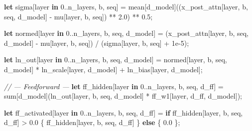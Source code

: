 \documentclass[11pt,]{article}
\newenvironment{Shaded}{}{}
\newcommand{\CommentTok}[1]{\textcolor[rgb]{0.38,0.63,0.69}{\textit{#1}}}
\newcommand{\DecValTok}[1]{\textcolor[rgb]{0.25,0.63,0.44}{#1}}
\newcommand{\KeywordTok}[1]{\textcolor[rgb]{0.00,0.44,0.13}{\textbf{#1}}}
\newcommand{\NormalTok}[1]{#1}
\newcommand{\OperatorTok}[1]{\textcolor[rgb]{0.40,0.40,0.40}{#1}}
\begin{document}
\begin{Shaded}
\begin{Highlighting}[]
\KeywordTok{let}\NormalTok{ sigma}\OperatorTok{[}\NormalTok{layer }\KeywordTok{in} \DecValTok{0.}\NormalTok{.n_layers, b, seq}\OperatorTok{]}\NormalTok{ =}
\NormalTok{    mean}\OperatorTok{[}\NormalTok{d_model}\OperatorTok{]}\NormalTok{((x_post_attn}\OperatorTok{[}\NormalTok{layer, b, seq, d_model}\OperatorTok{]}\NormalTok{ -}
\NormalTok{                    mu}\OperatorTok{[}\NormalTok{layer, b, seq}\OperatorTok{]}\NormalTok{) ** }\DecValTok{2.0}\NormalTok{) ** }\DecValTok{0.5}\NormalTok{;}

\KeywordTok{let}\NormalTok{ normed}\OperatorTok{[}\NormalTok{layer }\KeywordTok{in} \DecValTok{0.}\NormalTok{.n_layers, b, seq, d_model}\OperatorTok{]}\NormalTok{ =}
\NormalTok{    (x_post_attn}\OperatorTok{[}\NormalTok{layer, b, seq, d_model}\OperatorTok{]}\NormalTok{ - mu}\OperatorTok{[}\NormalTok{layer, b, seq}\OperatorTok{]}\NormalTok{)}
\NormalTok{    / (sigma}\OperatorTok{[}\NormalTok{layer, b, seq}\OperatorTok{]}\NormalTok{ + }\DecValTok{1}\NormalTok{e-}\DecValTok{5}\NormalTok{);}

\KeywordTok{let}\NormalTok{ ln_out}\OperatorTok{[}\NormalTok{layer }\KeywordTok{in} \DecValTok{0.}\NormalTok{.n_layers, b, seq, d_model}\OperatorTok{]}\NormalTok{ =}
\NormalTok{    normed}\OperatorTok{[}\NormalTok{layer, b, seq, d_model}\OperatorTok{]}\NormalTok{ * ln_scale}\OperatorTok{[}\NormalTok{layer, d_model}\OperatorTok{]}
\NormalTok{    + ln_bias}\OperatorTok{[}\NormalTok{layer, d_model}\OperatorTok{]}\NormalTok{;}

\CommentTok{// --- Feedforward ---}
\KeywordTok{let}\NormalTok{ ff_hidden}\OperatorTok{[}\NormalTok{layer }\KeywordTok{in} \DecValTok{0.}\NormalTok{.n_layers, b, seq, d_ff}\OperatorTok{]}\NormalTok{ =}
\NormalTok{    sum}\OperatorTok{[}\NormalTok{d_model}\OperatorTok{]}\NormalTok{(ln_out}\OperatorTok{[}\NormalTok{layer, b, seq, d_model}\OperatorTok{]}\NormalTok{ *}
\NormalTok{                  ff_w1}\OperatorTok{[}\NormalTok{layer, d_ff, d_model}\OperatorTok{]}\NormalTok{);}

\KeywordTok{let}\NormalTok{ ff_activated}\OperatorTok{[}\NormalTok{layer }\KeywordTok{in} \DecValTok{0.}\NormalTok{.n_layers, b, seq, d_ff}\OperatorTok{]}\NormalTok{ =}
    \KeywordTok{if}\NormalTok{ ff_hidden}\OperatorTok{[}\NormalTok{layer, b, seq, d_ff}\OperatorTok{]}\NormalTok{ > }\DecValTok{0.0}
        \OperatorTok{\{}\NormalTok{ ff_hidden}\OperatorTok{[}\NormalTok{layer, b, seq, d_ff}\OperatorTok{]} \OperatorTok{\}}
        \KeywordTok{else} \OperatorTok{\{} \DecValTok{0.0} \OperatorTok{\}}\NormalTok{;}


\end{Highlighting}
\end{Shaded}
\end{document}
